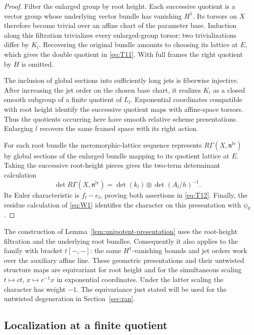 \documentclass[11pt]{article}
\numberwithin{equation}{section}
\theoremstyle{definition}
\theoremstyle{remark}
\begin{document}
\begin{proof}
Filter the enlarged group by root height.  Each successive quotient
is a vector group whose underlying vector bundle has vanishing
$H^1$.  Its torsors on $X$ therefore become trivial over an affine
chart of the parameter base.  Induction along this filtration
trivializes every enlarged-group torsor; two trivializations differ
by $K_l$.  Recovering the original bundle amounts to choosing its
lattice at $E$, which gives the double quotient in \eqref{eq:T11}.
With full frames the right quotient by $H$ is omitted.

The inclusion of global sections into sufficiently long jets is
fiberwise injective.  After increasing the jet order on the chosen
base chart, it realizes $K_l$ as a closed smooth subgroup of a finite
quotient of $L_l$.  Exponential coordinates compatible with root
height identify the successive quotient maps with affine-space
torsors.  Thus the quotients occurring here have smooth relative
scheme presentations.  Enlarging $l$ recovers the same framed space
with its right action.

For each root bundle the meromorphic-lattice sequence represents
$R\Gamma(X,\mathfrak n^{\mathrm{lv}})$ by global sections of the
enlarged bundle mapping to its quotient lattice at $E$.  Taking the
successive root-height pieces gives the two-term determinant
calculation
\[
 \det R\Gamma(X,\mathfrak n^{\mathrm{lv}})
       =\det(k_l)\otimes\det(A_l/h)^{-1}.
\]
Its Euler characteristic is $f_l-e_l$, proving both assertions in
\eqref{eq:T12}.  Finally, the residue calculation of \eqref{eq:W1}
identifies the character on this presentation with $\psi_0$.
\end{proof}

The construction of Lemma~\ref{lem:unipotent-presentation} uses the
root-height filtration and the underlying root bundles.  Consequently
it also applies to the family with bracket $t[-,-]$: the same
$H^1$-vanishing bounds and jet orders work over the auxiliary affine
line.  These geometric presentations and their untwisted structure
maps are equivariant for root height and for the simultaneous scaling
$t\mapsto ct$, $x\mapsto c^{-1}x$ in exponential coordinates.
Under the latter scaling the character has weight $-1$.  The
equivariance just stated will be used for the untwisted degeneration
in Section~\ref{sec:ran}.

\subsection{Localization at a finite quotient}
\end{document}

